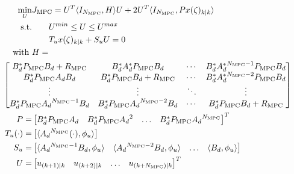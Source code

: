 \begin{equation} \label{eq:3_MPC_QP}
    \begin{aligned}
        \min_{U} &J_{\mathrm{MPC}} = U^T \langle I_{N_{\mathrm{MPC}}},H \rangle U + 2U^T \langle I_{N_{\mathrm{MPC}}}, P x(\zeta)_{k|k} \rangle \\
        \text{s.t.} &\qquad U^{min} \leq U \leq U^{max} \\
        &\qquad T_u {x}(\zeta)_{k|k} + S_u U = 0
        \, \\
        \text{with } &H = \\
        &\hspace{-3.5em }\begin{bmatrix}
            {B}_d^\ast P_{\mathrm{MPC}} {B}_d + {R_{\mathrm{MPC}}} & {B}_d^\ast {A}_d^\ast P_{\mathrm{MPC}} {B}_d & \cdots &  {B}_d^\ast {{A}_d^\ast}^{N_{\mathrm{MPC}}-1} P_{\mathrm{MPC}} {B}_d \\
            {B}_d^\ast P_{\mathrm{MPC}} {A}_d {B}_d & {B}_d^\ast P_{\mathrm{MPC}} {B}_d + {R_{\mathrm{MPC}}} & \cdots & {B}_d^\ast {{A}_d^\ast}^{N_{\mathrm{MPC}}-2} P_{\mathrm{MPC}} {B}_d \\
            \vdots & \vdots & \ddots & \vdots \\
            {B}_d^\ast P_{\mathrm{MPC}} {{A}_d}^{N_{\mathrm{MPC}}-1} {B}_d & {B}_d^\ast P_{\mathrm{MPC}} {{A}_d}^{N_{\mathrm{MPC}}-2} {B}_d & \cdots & {B}_d^\ast P_{\mathrm{MPC}} {B}_d + {R_{\mathrm{MPC}}}
        \end{bmatrix} \\
        P = &\begin{bmatrix}
            {B}_d^\ast P_{\mathrm{MPC}} {{A}_d} &
            {B}_d^\ast P_{\mathrm{MPC}} {{A}_d}^{2}  &
            \hdots & {B}_d^\ast P_{\mathrm{MPC}} {{A}_d}^{N_{\mathrm{MPC}}} 
        \end{bmatrix}^T \\
        T_u (\cdot) = &\begin{bmatrix}
            \langle {{A}_d}^{N_{\mathrm{MPC}}} (\cdot), {\phi_u} \rangle
        \end{bmatrix} \\
        S_u = &\begin{bmatrix}
            \langle {{A}_d}^{N_{\mathrm{MPC}}-1} {B}_d, {\phi_u} \rangle & 
            \langle {{A}_d}^{N_{\mathrm{MPC}}-2} {B}_d, {\phi_u} \rangle &
            \hdots &
            \langle {B}_d, {\phi_u} \rangle
        \end{bmatrix} \\
        U = &\begin{bmatrix}
            u_{(k+1)|k} & u_{(k+2)|k} & \hdots & u_{(k+N_{\mathrm{MPC}})|k}
        \end{bmatrix}^T
    \end{aligned}
\end{equation}

